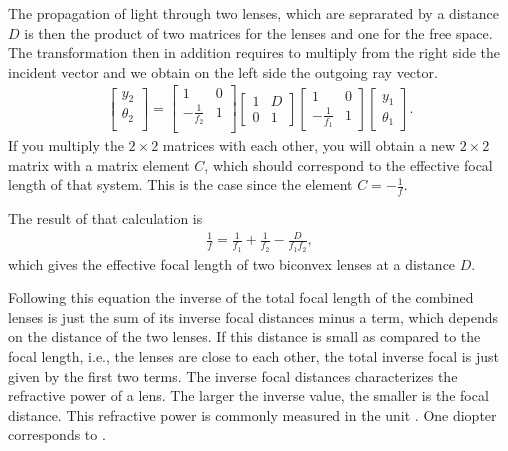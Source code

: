 \documentclass[letterpaper,10pt,english]{sphinxmanual}
\begin{document}
The propagation of light through two lenses, which are seprarated by a distance \(D\) is then the product of two matrices for the lenses and one for the free space. The transformation then in addition requires to multiply from the right side the incident vector and we obtain on the left side the outgoing ray vector.
\begin{equation*}
\begin{split}\begin{bmatrix}
y_2\\
\theta_2\\
\end{bmatrix}
=
\begin{bmatrix}
1 & 0\\
-\frac{1}{f_2} & 1 \\
\end{bmatrix}
\begin{bmatrix}
1 & D\\
0 & 1
\end{bmatrix}
\begin{bmatrix}
1 & 0\\
-\frac{1}{f_1} & 1
\end{bmatrix}
\begin{bmatrix}
y_1\\
\theta_1
\end{bmatrix}.\end{split}
\end{equation*}
If you multiply the \(2 \times 2\) matrices with each other, you will obtain a new \(2 \times 2\) matrix with a matrix element \(C\), which should correspond to the effective focal length of that system. This is the case since the element \(C=-\frac{1}{f}\).

The result of that calculation is
\begin{equation*}
\begin{split}\frac{1}{f}=\frac{1}{f_1}+\frac{1}{f_2}-\frac{D}{f_1 f_2},\end{split}
\end{equation*}
which gives the effective focal length of two biconvex lenses at a distance \(D\).

Following this equation the inverse of the total focal length of the combined lenses is just the sum of its inverse focal distances minus a term, which depends on the distance of the two lenses. If this distance is small as compared to the focal length, i.e., the lenses are close to each other, the total inverse focal is just given by the first two terms. The inverse focal distances characterizes the refractive power of a lens. The larger the inverse value, the smaller is the focal distance.
This refractive power is commonly measured in the unit . One diopter corresponds to .
\end{document}
